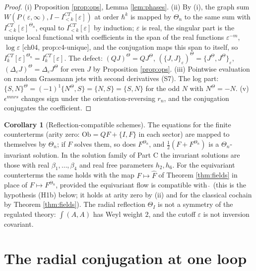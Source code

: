 \documentclass[11pt]{article}
\theoremstyle{definition}
\newtheorem{corollary}[definition]{Corollary}
\begin{document}
\begin{proof}
(i) Proposition \ref{prop:ops}, Lemma \ref{lem:phases}. (ii) By (i), the graph sum $W(P(\varepsilon,\infty),I-I^{CT}_{<k}[\varepsilon])$ at order $\hbar^k$ is mapped by $\Theta_n$ to the same sum with $I^{CT}_{<k}[\varepsilon]^{\Theta_n}$, equal to $I^{CT}_{<k}[\varepsilon]$ by induction; $\varepsilon$ is real, the singular part is the unique local functional with coefficients in the span of the real functions $\varepsilon^{-m}$, $\log\varepsilon$ [ch04, prop:c4-unique], and the conjugation maps this span to itself, so $I^{CT}_k[\varepsilon]^{\Theta_n}=I^{CT}_k[\varepsilon]$. The defect: $(QJ)^\Theta=QJ^\Theta$, $(\{J,J\}_\varepsilon)^\Theta=\{J^\Theta,J^\Theta\}_\varepsilon$, $(\Delta_\varepsilon J)^\Theta=\Delta_\varepsilon J^\Theta$ for even $J$ by Proposition \ref{prop:ops}. (iii) Pointwise evaluation on random Grassmann jets with second derivatives (S7). The log part: $\{S,N\}^\Theta=(-1)^{1}\{N^\Theta,S\}=\{N,S\}=\{S,N\}$ for the odd $N$ with $N^\Theta=-N$. (v) $\epsilon^{mnrs}$ changes sign under the orientation-reversing $r_n$, and the conjugation conjugates the coefficient.
\end{proof}

\begin{corollary}[Reflection-compatible schemes]
\label{cor:scheme}
The equations for the finite counterterms (arity zero: $\mathrm{Ob}=QF+\{I,F\}$ in each sector) are mapped to themselves by $\Theta_n$; if $F$ solves them, so does $F^{\Theta_n}$, and $\frac12(F+F^{\Theta_n})$ is a $\Theta_n$-invariant solution. In the solution family of Part C the invariant solutions are those with real $\beta_1,\dots,\beta_4$ and real free parameters $h_2,h_6$. For the equivariant counterterms the same holds with the map $F\mapsto\widehat F$ of Theorem \ref{thm:fields} in place of $F\mapsto F^{\Theta_n}$, provided the equivariant flow is compatible with $\widehat{\ }$ (this is the hypothesis (H1b) below; it holds at arity zero by (ii) and for the classical cochain by Theorem \ref{thm:fields}). The radial reflection $\Theta_I$ is not a symmetry of the regulated theory: $\int(A,A)$ has Weyl weight $2$, and the cutoff $\varepsilon$ is not inversion covariant.
\end{corollary}

\section{The radial conjugation at one loop}
\label{sec:oneloop}
\end{document}

